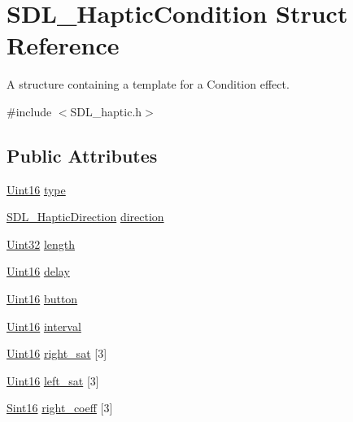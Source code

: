 \hypertarget{structSDL__HapticCondition}{}\section{S\+D\+L\+\_\+\+Haptic\+Condition Struct Reference}
\label{structSDL__HapticCondition}


A structure containing a template for a Condition effect.  




{\ttfamily \#include $<$S\+D\+L\+\_\+haptic.\+h$>$}

\subsection*{Public Attributes}
\begin{DoxyCompactItemize}
\item 
\hyperlink{SDL__stdinc_8h_a31fcc0a076c9068668173ee26d33e42b}{Uint16} \hyperlink{structSDL__HapticCondition_a7be55a9a86c05dd1a54a3006781cfa6f}{type}
\item 
\hyperlink{structSDL__HapticDirection}{S\+D\+L\+\_\+\+Haptic\+Direction} \hyperlink{structSDL__HapticCondition_a728507d30d18998949313de3a25e5581}{direction}
\item 
\hyperlink{SDL__stdinc_8h_add440eff171ea5f55cb00c4a9ab8672d}{Uint32} \hyperlink{structSDL__HapticCondition_ad0efb0a6ddc20f058e87199eaaa95978}{length}
\item 
\hyperlink{SDL__stdinc_8h_a31fcc0a076c9068668173ee26d33e42b}{Uint16} \hyperlink{structSDL__HapticCondition_aad40417980530ca8d80c62ba864a090b}{delay}
\item 
\hyperlink{SDL__stdinc_8h_a31fcc0a076c9068668173ee26d33e42b}{Uint16} \hyperlink{structSDL__HapticCondition_acd35a9d432ad122bf7824b16974eac7a}{button}
\item 
\hyperlink{SDL__stdinc_8h_a31fcc0a076c9068668173ee26d33e42b}{Uint16} \hyperlink{structSDL__HapticCondition_aafc182abea1078bed7e9cf5d0e713ea2}{interval}
\item 
\hyperlink{SDL__stdinc_8h_a31fcc0a076c9068668173ee26d33e42b}{Uint16} \hyperlink{structSDL__HapticCondition_a90427a1e0d464b4b53abc1d419c97b2e}{right\+\_\+sat} \mbox{[}3\mbox{]}
\item 
\hyperlink{SDL__stdinc_8h_a31fcc0a076c9068668173ee26d33e42b}{Uint16} \hyperlink{structSDL__HapticCondition_a953448774c40818a4f47c6efea21124d}{left\+\_\+sat} \mbox{[}3\mbox{]}
\item 
\hyperlink{SDL__stdinc_8h_a9d0257032c0e146ab6121bf0122712f5}{Sint16} \hyperlink{structSDL__HapticCondition_a3de7f164ef88841255535387d0f100b6}{right\+\_\+coeff} \mbox{[}3\mbox{]}

\end{DoxyCompactItemize}
